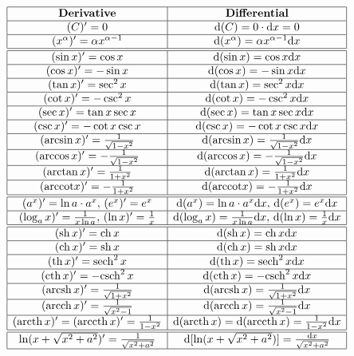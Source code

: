 \documentclass[11pt]{../../TexTemplate/elegantbook}
\begin{document}
\[
\begin{array}{|c|c|}
\hline
\textbf{Derivative} & \textbf{Differential} \\
\hline
(C)'=0 & \mathrm{d}(C)=0\cdot \mathrm{d}x=0 \\
\hline
(x^\alpha)'=\alpha x^{\alpha-1} & \mathrm{d}(x^\alpha)=\alpha x^{\alpha-1}\mathrm{d}x \\
\hline
\hline
(\sin x)'=\cos x & \mathrm{d}(\sin x)=\cos x\mathrm{d}x \\
\hline
(\cos x)'=-\sin x & \mathrm{d}(\cos x)=-\sin x\mathrm{d}x \\
\hline
(\tan x)'=\sec^2x & \mathrm{d}(\tan x)=\sec^2x\mathrm{d}x \\
\hline
(\cot x)'=-\csc^2x & \mathrm{d}(\cot x)=-\csc^2x\mathrm{d}x \\
\hline
(\sec x)'=\tan x\sec x & \mathrm{d}(\sec x)=\tan x\sec x\mathrm{d}x \\
\hline
(\csc x)'=-\cot x\csc x & \mathrm{d}(\csc x)=-\cot x\csc x\mathrm{d}x \\
\hline
(\arcsin x)'=\frac{1}{\sqrt{1-x^2}} & \mathrm{d}(\arcsin x)=\frac{1}{\sqrt{1-x^2}}\mathrm{d}x \\
\hline
(\arccos x)'=-\frac{1}{\sqrt{1-x^2}} & \mathrm{d}(\arccos x)=-\frac{1}{\sqrt{1-x^2}}\mathrm{d}x \\
\hline
(\arctan x)'=\frac{1}{1+x^2} & \mathrm{d}(\arctan x)=\frac{1}{1+x^2}\mathrm{d}x \\
\hline
(\mathrm{arccot} x)'=-\frac{1}{1+x^2} & \mathrm{d}(\mathrm{arccot} x)=-\frac{1}{1+x^2}\mathrm{d}x \\
\hline
\hline
(a^x)'=\ln a\cdot a^x, \, (e^x)'=e^x & \mathrm{d}(a^x)=\ln a\cdot a^x\mathrm{d}x, \, \mathrm{d}(e^x)=e^x\mathrm{d}x \\
\hline
(\log_{a}x)'=\frac{1}{x\ln a}, \, (\ln x)'=\frac{1}{x} & \mathrm{d}(\log_{a}x)=\frac{1}{x\ln a}\mathrm{d}x, \, \mathrm{d}(\ln x)=\frac{1}{x}\mathrm{d}x \\
\hline
\hline
(\mathrm{sh}\,x)'=\mathrm{ch}\,x & \mathrm{d}(\mathrm{sh}\,x)=\mathrm{ch}\,x\mathrm{d}x \\
\hline
(\mathrm{ch}\,x)'=\mathrm{sh}\,x & \mathrm{d}(\mathrm{ch}\,x)=\mathrm{sh}\,x\mathrm{d}x \\
\hline
(\mathrm{th}\,x)'=\mathrm{sech}^2\,x & \mathrm{d}(\mathrm{th}\,x)=\mathrm{sech}^2\,x\mathrm{d}x \\
\hline
(\mathrm{cth}\,x)'=-\mathrm{csch}^2\,x & \mathrm{d}(\mathrm{cth}\,x)=-\mathrm{csch}^2\,x\mathrm{d}x \\
\hline
(\mathrm{arcsh}\,x)'=\frac{1}{\sqrt{1+x^2}} & \mathrm{d}(\mathrm{arcsh}\,x)=\frac{1}{\sqrt{1+x^2}}\mathrm{d}x \\
\hline
(\mathrm{arcch}\,x)'=\frac{1}{\sqrt{x^2-1}} & \mathrm{d}(\mathrm{arcch}\,x)=\frac{1}{\sqrt{x^2-1}}\mathrm{d}x \\
\hline
(\mathrm{arcth}\,x)'=(\mathrm{arccth}\,x)'=\frac{1}{1-x^2} & 
    \mathrm{d}(\mathrm{arcth}\,x)=\mathrm{d}(\mathrm{arccth}\,x)=\frac{1}{1-x^2}\mathrm{d}x \\
\hline
\hline
\ln(x+\sqrt{x^2+a^2})'=\frac{1}{\sqrt{x^2+a^2}} & \mathrm{d}[\ln(x+\sqrt{x^2+a^2})]=\frac{\mathrm{d}x}{\sqrt{x^2+a^2}} \\
\hline
\end{array}
\]
\end{document}
